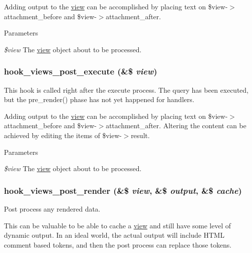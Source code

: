 Adding output to the \hyperlink{classview}{view} can be accomplished by placing text on \$view-\/$>$attachment\_\-before and \$view-\/$>$attachment\_\-after. 
\begin{DoxyParams}{Parameters}
\item[{\em \$view}]The \hyperlink{classview}{view} object about to be processed. \end{DoxyParams}
\hypertarget{group__views__hooks_ga52e5f67061bf3a8cb9f8bf208d9a1357}{
\subsubsection[{hook\_\-views\_\-post\_\-execute}]{\setlength{\rightskip}{0pt plus 5cm}hook\_\-views\_\-post\_\-execute (\&\$ {\em view})}}
\label{group__views__hooks_ga52e5f67061bf3a8cb9f8bf208d9a1357}
This hook is called right after the execute process. The query has been executed, but the pre\_\-render() phase has not yet happened for handlers.

Adding output to the \hyperlink{classview}{view} can be accomplished by placing text on \$view-\/$>$attachment\_\-before and \$view-\/$>$attachment\_\-after. Altering the content can be achieved by editing the items of \$view-\/$>$result. 
\begin{DoxyParams}{Parameters}
\item[{\em \$view}]The \hyperlink{classview}{view} object about to be processed. \end{DoxyParams}
\hypertarget{group__views__hooks_ga21cc61642e5cafc23ec621f07dae1f4b}{
\subsubsection[{hook\_\-views\_\-post\_\-render}]{\setlength{\rightskip}{0pt plus 5cm}hook\_\-views\_\-post\_\-render (\&\$ {\em view}, \/  \&\$ {\em output}, \/  \&\$ {\em cache})}}
\label{group__views__hooks_ga21cc61642e5cafc23ec621f07dae1f4b}
Post process any rendered data.

This can be valuable to be able to cache a \hyperlink{classview}{view} and still have some level of dynamic output. In an ideal world, the actual output will include HTML comment based tokens, and then the post process can replace those tokens.

